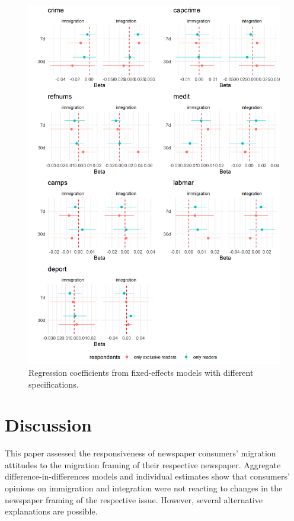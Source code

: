 \documentclass{article}
\begin{document}
\begin{figure}
    \centering
    \includegraphics[width=\textwidth]{paper/vis/effectplot_frames_fe_abs.png}
    \caption{Regression coefficients from fixed-effects models with different specifications.}
    \label{fig:model_fe}
\end{figure}


\section{Discussion}

This paper assessed the responsiveness of newspaper consumers' migration attitudes to the migration framing of their respective newspaper. Aggregate difference-in-differences models and individual estimates show that consumers' opinions on immigration and integration were not reacting to changes in the newspaper framing of the respective issue. However, several alternative explanations are possible. 
\end{document}
